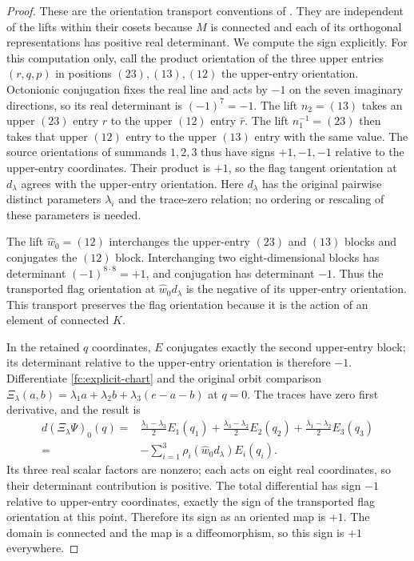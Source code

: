 \documentclass[11pt]{article}
\theoremstyle{definition}
\begin{document}
\begin{proof}
These are the orientation transport conventions of
\cite[Section~3, pp.~495--496]{MareWillems2013}.
They are independent of the lifts within their cosets because
$M$ is connected and each of its orthogonal representations has
positive real determinant.
We compute the sign explicitly. For this computation only, call
the product orientation of the three upper entries $(r,q,p)$ in
positions $(23),(13),(12)$ the upper-entry orientation. Octonionic
conjugation fixes the real line and acts by $-1$ on the seven
imaginary directions, so its real determinant is $(-1)^7=-1$.
The lift $n_2=(13)$ takes an upper $(23)$ entry $r$ to the upper
$(12)$ entry $\bar r$. The lift $n_1^{-1}=(23)$ then takes that
upper $(12)$ entry to the upper $(13)$ entry with the same value.
The source orientations of summands $1,2,3$ thus have signs
$+1,-1,-1$ relative to the upper-entry coordinates. Their product
is $+1$, so the flag tangent orientation at $d_\lambda$ agrees
with the upper-entry orientation. Here $d_\lambda$ has the original
pairwise distinct parameters $\lambda_i$ and the trace-zero relation;
no ordering or rescaling of these parameters is needed.

The lift $\widehat w_0=(12)$ interchanges the upper-entry
$(23)$ and $(13)$ blocks and conjugates the $(12)$ block.
Interchanging two eight-dimensional blocks has determinant
$(-1)^{8\cdot8}=+1$, and conjugation has determinant $-1$.
Thus the transported flag orientation at
$\widehat w_0d_\lambda$ is the negative of its upper-entry
orientation. This transport preserves the flag orientation because
it is the action of an element of connected $K$.

In the retained $q$ coordinates, $E$ conjugates exactly the second
upper-entry block; its determinant relative to the upper-entry
orientation is therefore $-1$. Differentiate
\eqref{fc:explicit-chart} and the original orbit comparison
$\Xi_\lambda(a,b)=\lambda_1a+\lambda_2b+\lambda_3(e-a-b)$
at $q=0$. The traces have zero first derivative, and the result is
\begin{equation}
 \begin{split}
 d(\Xi_\lambda\Psi)_0(q)
 ={}&\frac{\lambda_1-\lambda_3}{2}E_1(q_1)
    +\frac{\lambda_3-\lambda_2}{2}E_2(q_2)
    +\frac{\lambda_1-\lambda_2}{2}E_3(q_3)\\
 ={}&-\sum_{i=1}^3\rho_i(\widehat w_0d_\lambda)E_i(q_i).
 \end{split}
 \label{fc:chart-differential}
\end{equation}
Its three real scalar factors are nonzero; each acts on eight
real coordinates, so their determinant contribution is positive.
The total differential has sign $-1$ relative to upper-entry
coordinates, exactly the sign of the transported flag orientation
at this point. Therefore its sign as an oriented map is $+1$.
The domain is connected and the map is a diffeomorphism, so this
sign is $+1$ everywhere.
\end{proof}
\end{document}
